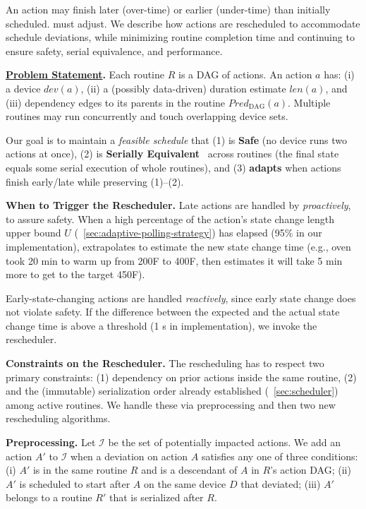 An action may finish later (over-time) or earlier (under-time) than initially scheduled. \sysname{} must adjust.
We describe how actions are rescheduled to accommodate schedule deviations,
while minimizing routine completion time and continuing to ensure safety, serial equivalence, and performance.

{
\noindent \textbf{\underline{Problem Statement}. }
Each routine $R$ is a DAG of actions. An action $a$ has:
(i) a device $dev(a)$,
(ii) a (possibly data-driven) duration estimate $len(a)$, and
(iii) dependency edges to its parents in the routine $Pred_{\text{DAG}}(a)$.
Multiple routines may run concurrently and touch overlapping device sets.

Our goal is to maintain a {\it feasible schedule} that (1) is \textbf{Safe} (no device runs two actions at once), (2) is \textbf{Serially Equivalent}~\cite{SafeHomeEuroSys2021}  across routines (the final state equals some serial execution of whole routines), and (3) \textbf{adapts} when actions finish early/late while preserving (1)–(2).

}

\noindent \textbf{{When to Trigger the Rescheduler}. }
%
Late actions are handled by \sysname{} {\it proactively}, to assure safety. When a high percentage of the action's state change length upper bound $U$ (\Section~\ref{sec:adaptive-polling-strategy}) has elapsed (95\% in our implementation), \sysname{} extrapolates to estimate the new state change time (e.g., oven took 20 min to warm up from 200\textdegree F to 400\textdegree F, then \sysname{} estimates it will take 5 min more to get to the target 450\textdegree F).

Early-state-changing actions are handled
{\it reactively}, since early state change does not violate safety. If the difference between the expected and the actual state change time is above a threshold (1 s in implementation), we invoke the rescheduler. 

\noindent \textbf{{Constraints on the Rescheduler}. } 
The rescheduling has to respect two primary constraints: (1) dependency on prior actions inside the same routine, (2) and the (immutable) serialization order already established (\Section~\ref{sec:scheduler}) among active routines. We handle these via preprocessing and then two new rescheduling algorithms. 


\noindent \textbf{{Preprocessing}.}
Let $\mathcal{I}$ be the set of potentially impacted actions. 
We add an action $A'$ to $\mathcal{I}$ when a deviation on action $A$ satisfies any one of three conditions:
(i) $A'$ is in the same routine $R$ and is a descendant of $A$ in $R$'s action DAG;
(ii) $A'$ is scheduled to start after $A$ on the same device $D$ that deviated;
(iii) $A'$ belongs to a routine $R'$ that is serialized after $R$.

